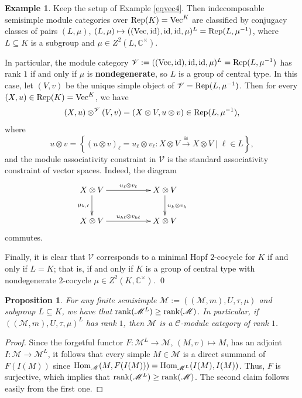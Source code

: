\documentclass{amsart}
\newtheorem{proposition}[theorem]{Proposition}
\theoremstyle{definition}
\newtheorem{example}[theorem]{Example}
\newcommand{\id}{{\rm id}}
\newcommand{\Hom}{{\rm Hom}}
\newcommand{\Rep}{{\rm Rep}}
\newcommand{\Vect}{{\rm Vec}}
\newcommand{\C}{\mathscr{C}}
\newcommand{\M}{\mathscr{M}}
\newcommand{\V}{\mathscr{V}}
\newcommand{\ot}{\otimes}
\numberwithin{equation}{section}
\begin{document}
\begin{example}\label{eqvec5}
Keep the setup of Example \ref{eqvec4}. Then indecomposable semisimple module categories over $\Rep(K)=\Vect^K$ are classified by conjugacy classes of pairs $(L,\mu)$, $(L,\mu)\mapsto ((\Vect,\id),\id,\id,\mu)^L ={\rm Rep}(L,\mu^{-1})$, where $L\subseteq K$ is a subgroup and $\mu\in Z^2(L,\mathbb{C}^{\times})$. 

In particular, the module category $\V:=((\Vect,\id),\id,\id,\mu)^L={\rm Rep}(L,\mu^{-1})$ has rank $1$ if and only if 
$\mu$ is {\bf nondegenerate}, so $L$ is a group of central type. In this case, let $(V,v)$ be the unique simple object of $\V={\rm Rep}(L,\mu^{-1})$.
Then for every $(X,u)\in \Rep(K)=\Vect^K$, we have
$$(X,u)\ot ^{\V}(V,v)=(X\ot V,u\ot v)\in {\rm Rep}(L,\mu^{-1}),$$
where  
$$u\ot v=\left\{\left(u\ot v\right)_{\ell}=u_{\ell}\ot v_{\ell}:X\ot V\xrightarrow{\cong}X\ot V\mid \ell\in L\right\},$$ 
and the module associativity constraint in $\V$ is the standard associativity constraint of vector spaces. Indeed, 
the diagram
\begin{equation}\label{diagramv1}
\xymatrix{X\ot V\ar[d]_{\mu_{k,\ell}}\ar[rr]^{u_{\ell}\ot v_{\ell}}&& X\ot V\ar[d]^{u_{k}\ot v_{k}} &&\\
X\ot V\ar[rr]^{u_{k\ell }\ot v_{k\ell}}&& X\ot V&&}
\end{equation}
commutes.

Finally, it is clear that $\V$ corresponds to a minimal Hopf $2$-cocycle for $K$ if and only if $L=K$; that is, if and only if $K$ is a group of central type with nondegenerate $2$-cocycle $\mu\in Z^2(K,\mathbb{C}^{\times})$. \qed
\end{example}
 
\begin{proposition}\label{rankddec}
For any finite semisimple $\M:=((\M,m),U,\tau,\mu)$ and subgroup $L\subseteq K$, we have that ${\rm rank}(\M^L)\ge {\rm rank}(\M)$. 
In particular, if $((\M,m),U,\tau,\mu)^L$ has rank $1$, then $\M$ is a $\C$-module category of rank $1$.
\end{proposition}

\begin{proof}
Since the forgetful functor $F:\M^L\to \M$, $(M,v)\mapsto M$, has an adjoint $I:\M\to \M^L$, it follows that every simple $M\in \M$ is a direct summand of $F(I(M))$ since $\Hom_{\M}(M,F(I(M)))=\Hom_{\M^L}(I(M),I(M))$. Thus, $F$ is surjective, which implies that ${\rm rank}(\M^L)\ge {\rm rank}(\M)$. The second claim follows easily from the first one.
\end{proof}
\end{document}
